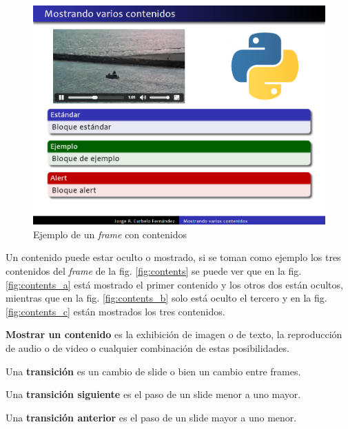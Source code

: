 		\begin{figure}[tb]
 			\centering
 			\includegraphics[width=12cm]{img/frame-video-image}
 			\caption{Ejemplo de un \textit{frame} con contenidos}
 			\label{fig:frame_video_image}
 		\end{figure}

 		Un contenido puede estar oculto o mostrado, si se toman como ejemplo los tres contenidos del \textit{frame} de la fig. \ref{fig:contents} se puede ver que en la fig. \ref{fig:contents_a} está mostrado el primer contenido y los otros dos están ocultos, mientras que en la fig. \ref{fig:contents_b} solo está oculto el tercero y en la fig. \ref{fig:contents_c} están mostrados los tres contenidos.


		\begin{definition}
		\label{def:show}
			\textbf{Mostrar un contenido} es la exhibición de imagen o de texto, la reproducción de audio o de video o cualquier combinación de estas posibilidades.
		\end{definition} 		


 		\begin{definition}
 		\label{def:transition}
 			Una \textbf{transición} es un cambio de \textnormal{slide} o bien un cambio entre \textnormal{frames}.
 		\end{definition}

 		\begin{definition}
 		\label{def:next_transition}
 			Una \textbf{transición siguiente} es el paso de un \textnormal{slide} menor a uno mayor.
 		\end{definition} 		

 		\begin{definition}
 		\label{def:prev_transition}
 			Una \textbf{transición anterior} es el paso de un \textnormal{slide} mayor a uno menor.
 		\end{definition}

